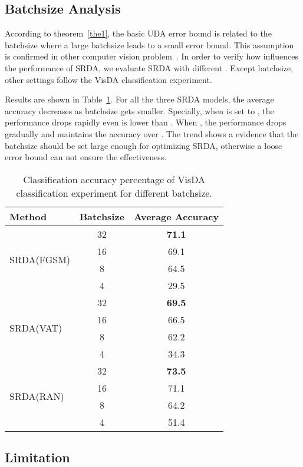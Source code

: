 \documentclass[10pt,twocolumn,letterpaper]{article}
\begin{document}
\subsection{Batchsize Analysis}

According to theorem~\ref{the1}, the basic UDA error bound is related to the batchsize  where a large batchsize leads to a small error bound. This assumption is confirmed in other computer vision problem~\cite{he2018bag,brock2018large}. In order to verify how  influences the performance of SRDA, we evaluate SRDA with different . Except batchsize, other settings follow the VisDA classification experiment.

Results are shown in Table~\ref{tab:batchsize}. For all the three SRDA models, the average accuracy decreases as batchsize gets smaller. Specially, when  is set to , the performance drops rapidly even is lower than . When , the performance drops gradually and maintains the accuracy over . The trend shows a evidence that the batchsize  should be set large enough for optimizing SRDA, otherwise a loose error bound can not ensure the effectiveness.

\begin{table}[htbp]
\centering
\caption{Classification accuracy percentage of VisDA classification experiment for different batchsize.}
\label{tab:batchsize}
\begin{tabular}{l|cc}
\hline\hline
Method& Batchsize & Average Accuracy \\
\hline
\multirow{4}{*}{SRDA(FGSM)}& 32& {\bf 71.1}\\
& 16& 69.1\\
& 8& 64.5\\
& 4& 29.5\\
\hline
\multirow{4}{*}{SRDA(VAT)}& 32& {\bf 69.5}\\
& 16& 66.5\\
& 8& 62.2\\
& 4& 34.3\\
\hline
\multirow{4}{*}{SRDA(RAN)}& 32& {\bf 73.5}\\
& 16& 71.1\\
& 8& 64.2\\
& 4& 51.4\\
\hline\hline
\end{tabular}
\end{table}

\subsection{Limitation}
\end{document}
